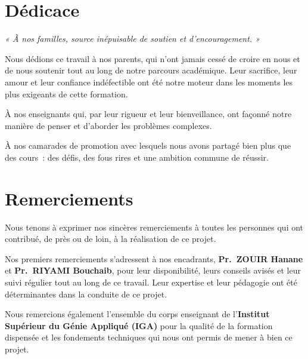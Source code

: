 \documentclass[a4paper,12pt]{extarticle}
\begin{document}
\newpage
\thispagestyle{empty}
\section*{Dédicace}

\begin{center}
\textit{\color{igablue}\large« À nos familles, source inépuisable de soutien et d'encouragement. »}
\end{center}

\vspace{1.5cm}
Nous dédions ce travail à nos parents, qui n'ont jamais cessé de croire en nous et de nous soutenir tout au long de notre parcours académique. Leur sacrifice, leur amour et leur confiance indéfectible ont été notre moteur dans les moments les plus exigeants de cette formation.

À nos enseignants qui, par leur rigueur et leur bienveillance, ont façonné notre manière de penser et d'aborder les problèmes complexes.

À nos camarades de promotion avec lesquels nous avons partagé bien plus que des cours~: des défis, des fous rires et une ambition commune de réussir.

\vfill

\newpage
\thispagestyle{empty}
\section*{Remerciements}

Nous tenons à exprimer nos sincères remerciements à toutes les personnes qui ont contribué, de près ou de loin, à la réalisation de ce projet.

Nos premiers remerciements s'adressent à nos encadrants, \textbf{Pr.~ZOUIR Hanane} et \textbf{Pr.~RIYAMI Bouchaib}, pour leur disponibilité, leurs conseils avisés et leur suivi régulier tout au long de ce travail. Leur expertise et leur pédagogie ont été déterminantes dans la conduite de ce projet.

Nous remercions également l'ensemble du corps enseignant de l'\textbf{Institut Supérieur du Génie Appliqué (IGA)} pour la qualité de la formation dispensée et les fondements techniques qui nous ont permis de mener à bien ce projet.
\end{document}

